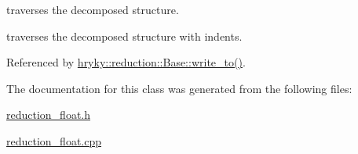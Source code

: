 traverses the decomposed structure. 

traverses the decomposed structure with indents. 

Referenced by \hyperlink{classhryky_1_1reduction_1_1_base_a709cc7c48e1c90fe253739e46d82aa19}{hryky\-::reduction\-::\-Base\-::write\-\_\-to()}.



The documentation for this class was generated from the following files\-:\begin{DoxyCompactItemize}
\item 
\hyperlink{reduction__float_8h}{reduction\-\_\-float.\-h}\item 
\hyperlink{reduction__float_8cpp}{reduction\-\_\-float.\-cpp}\end{DoxyCompactItemize}
